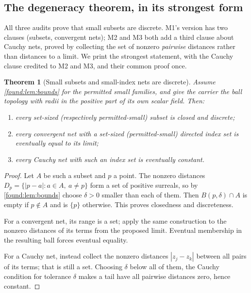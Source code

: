 \documentclass[11pt,letterpaper]{article}
\numberwithin{equation}{section}
\newtheorem{theorem}{Theorem}[section]
\theoremstyle{definition}
\theoremstyle{remark}
\begin{document}
\subsection{The degeneracy theorem, in its strongest form}
\label{found:sub:discrete}
All three audits prove that small subsets are discrete. M1's version has two
clauses (subsets, convergent nets); M2 and M3 both add a third clause about
Cauchy nets, proved by collecting the set of nonzero \emph{pairwise} distances
rather than distances to a limit. We print the strongest statement, with the
Cauchy clause credited to M2 and M3, and their common proof once.

\begin{theorem}[Small subsets and small-index nets are discrete]\label{found:thm:discrete}
Assume \cref{found:lem:bounds} for the permitted small families, and give the
carrier the ball topology with radii in the positive part of its own scalar
field. Then:
\begin{enumerate}
\item every set-sized (respectively permitted-small) subset is closed and
discrete;
\item every convergent net with a set-sized (permitted-small) directed index
set is eventually \emph{equal} to its limit;
\item every Cauchy net with such an index set is eventually constant.
\end{enumerate}
\end{theorem}
\begin{proof}
Let $A$ be such a subset and $p$ a point. The nonzero distances
$D_p=\{|p-a|:a\in A,\ a\ne p\}$ form a set of positive surreals, so by
\cref{found:lem:bounds} choose $\delta>0$ smaller than each of them. Then
$B(p,\delta)\cap A$ is empty if $p\notin A$ and is $\{p\}$ otherwise. This
proves closedness and discreteness.

For a convergent net, its range is a set; apply the same construction to the
nonzero distances of its terms from the proposed limit. Eventual membership in
the resulting ball forces eventual equality.

For a Cauchy net, instead collect the nonzero distances $|z_j-z_k|$ between all
pairs of its terms; that is still a set. Choosing $\delta$ below all of them,
the Cauchy condition for tolerance $\delta$ makes a tail have all pairwise
distances zero, hence constant.
\end{proof}
\end{document}
